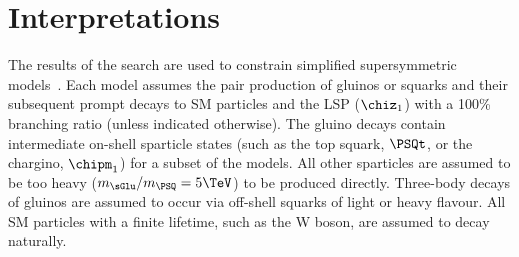\section{Interpretations} 

The results of the search are used to constrain simplified
supersymmetric models~\cite{Alwall:2008ag, Alwall:2008va, sms}. Each
model assumes the pair production of gluinos or squarks and their
subsequent prompt decays to SM particles and the LSP ($\chiz_1$) with
a 100\% branching ratio (unless indicated otherwise). The gluino
decays contain intermediate on-shell sparticle states (such as the top
squark, $\PSQt$, or the chargino, $\chipm_1$) for a subset of the
models. All other sparticles are assumed to be too heavy ($m_{\sGlu} /
m_{\PSQ} = 5\TeV$) to be produced directly. Three-body decays of
gluinos are assumed to occur via off-shell squarks of light or heavy
flavour. All SM particles with a finite lifetime, such as the W boson,
are assumed to decay naturally. 

